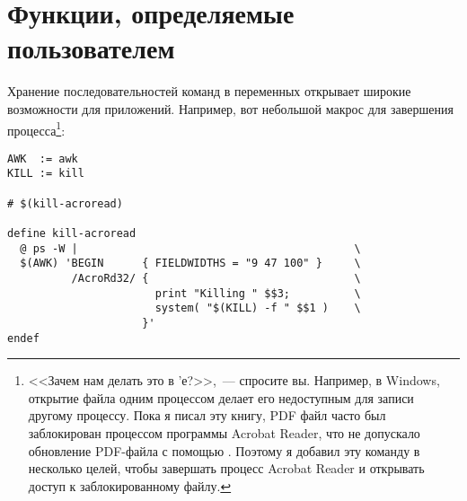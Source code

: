 \section{Функции, определяемые пользователем}
\label{sec:user_def_func}

Хранение последовательностей команд в переменных открывает широкие
возможности для приложений. Например, вот небольшой макрос для
завершения процесса\footnote{
<<Зачем нам делать это в \Makefile{}'е?>>,~--- спросите вы. Например,
в Windows, открытие файла одним процессом делает его недоступным
для записи другому процессу. Пока я писал эту книгу, PDF файл часто
был заблокирован процессом программы Acrobat Reader, что не допускало
обновление PDF-файла с помощью \GNUmake{}. Поэтому я добавил эту
команду в несколько целей, чтобы завершать процесс Acrobat Reader
и открывать доступ к заблокированному файлу.
}:

{\footnotesize
\begin{verbatim}
AWK  := awk
KILL := kill

# $(kill-acroread)

define kill-acroread
  @ ps -W |                                           \
  $(AWK) 'BEGIN      { FIELDWIDTHS = "9 47 100" }     \
          /AcroRd32/ {                                \
                       print "Killing " $$3;          \
                       system( "$(KILL) -f " $$1 )    \
                     }'
endef
\end{verbatim}
}

